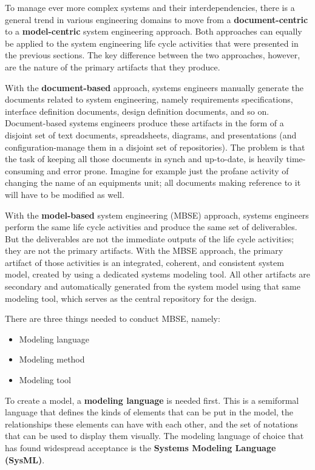 To manage ever more complex systems and their interdependencies, there is a general trend in various engineering domains to move from a \textbf{document-centric} to a \textbf{model-centric} system engineering approach. Both approaches can equally be applied to the system engineering life cycle activities that were presented in the previous sections. The key difference between the two approaches, however, are the nature of the primary artifacts that they produce. 

With the \textbf{document-based} approach, systems engineers manually generate the documents related to system engineering, namely requirements specifications, interface definition documents, design definition documents, and so on. Document-based systems engineers produce these artifacts in the form of a disjoint set of text documents, spreadsheets, diagrams, and presentations (and configuration-manage them in a disjoint set of repositories). The problem is that the task of keeping all those documents in synch and up-to-date, is heavily time-consuming and error prone. Imagine for example just the profane activity of changing the name of an equipments unit; all documents making reference to it will have to be modified as well.

With the \textbf{model-based} system engineering (MBSE) approach, systems engineers perform the same life cycle activities and produce the same set of deliverables. But the deliverables are not the immediate outputs of the life cycle activities; they are not the primary artifacts. With the MBSE approach, the primary artifact of those activities is an integrated, coherent, and consistent system model, created by using a dedicated systems modeling tool. All other artifacts are secondary and automatically generated from the system model using that same modeling tool, which serves as the central repository for the design.

There are three things needed to conduct MBSE, namely:

\begin{itemize}
\item Modeling language
\item Modeling method
\item Modeling tool
\end{itemize}

To create a model, a \textbf{modeling language} is needed first. This is a semiformal language that defines the kinds of elements that can be put in the model, the relationships these elements can have with each other, and the set of notations that can be used to display them visually. The modeling language of choice that has found widespread acceptance is the \textbf{Systems Modeling Language (SysML)}.

